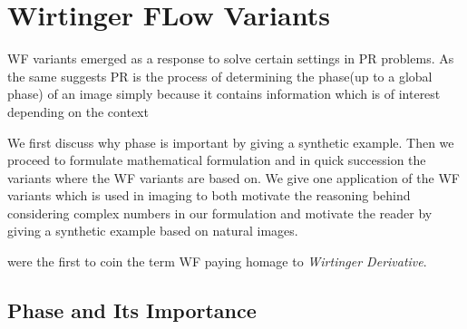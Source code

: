 \section{Wirtinger FLow Variants}
\ac{WF} variants emerged as a response to solve certain settings in \ac{PR} problems. As the same suggests \ac{PR} is the process of 
determining the phase(up to a global phase) of an image simply because it contains information which is of interest depending on the context

 

We first discuss why phase is important by giving a synthetic example. Then we proceed to formulate mathematical formulation and in quick succession 
the variants where the \ac{WF} variants are based on. We give one application of the \ac{WF} variants which is used in imaging 
to both motivate the reasoning behind considering complex numbers in our formulation and motivate the reader by giving a synthetic example based on 
natural images. 


 




\cite{Candes2014} were the first to coin the term \ac{WF} paying homage to \emph{Wirtinger Derivative}. 




\subsection{Phase and Its Importance}\label{sec:phase_importance}

